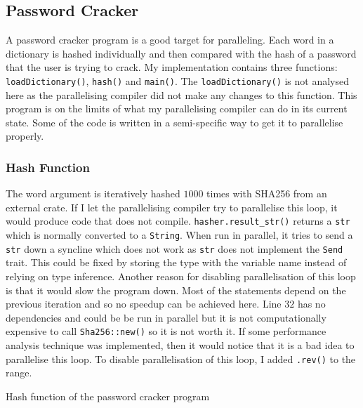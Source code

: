 \subsection{Password Cracker}
A password cracker program is a good target for paralleling. Each word in a dictionary is hashed individually and then compared with the hash of a password that the user is trying to crack. My implementation contains three functions: \texttt{loadDictionary()}, \texttt{hash()} and \texttt{main()}. The \texttt{loadDictionary()} is not analysed here as the parallelising compiler did not make any changes to this function. This program is on the limits of what my parallelising compiler can do in its current state. Some of the code is written in a semi-specific way to get it to parallelise properly.

\subsubsection{Hash Function}
The word argument is iteratively hashed $1000$ times with SHA256 from an external crate. If I let the parallelising compiler try to parallelise this loop, it would produce code that does not compile.
\texttt{hasher.result\_str()} returns a \texttt{str} which is normally converted to a \texttt{String}. When run in parallel, it tries to send a \texttt{str} down a syncline which does not work as \texttt{str} does not implement the \texttt{Send} trait.
This could be fixed by storing the type with the variable name instead of relying on type inference. Another reason for disabling parallelisation of this loop is that it would slow the program down. Most of the statements depend on the previous iteration and so no speedup can be achieved here. Line $32$ has no dependencies and could be be run in parallel but it is not computationally expensive to call \texttt{Sha256::new()} so it is not worth it. If some performance analysis technique was implemented, then it would notice that it is a bad idea to parallelise this loop.
To disable parallelisation of this loop, I added \texttt{.rev()} to the range. %

\begin{code}
    \caption{Hash function of the password cracker program}
\end{code}

